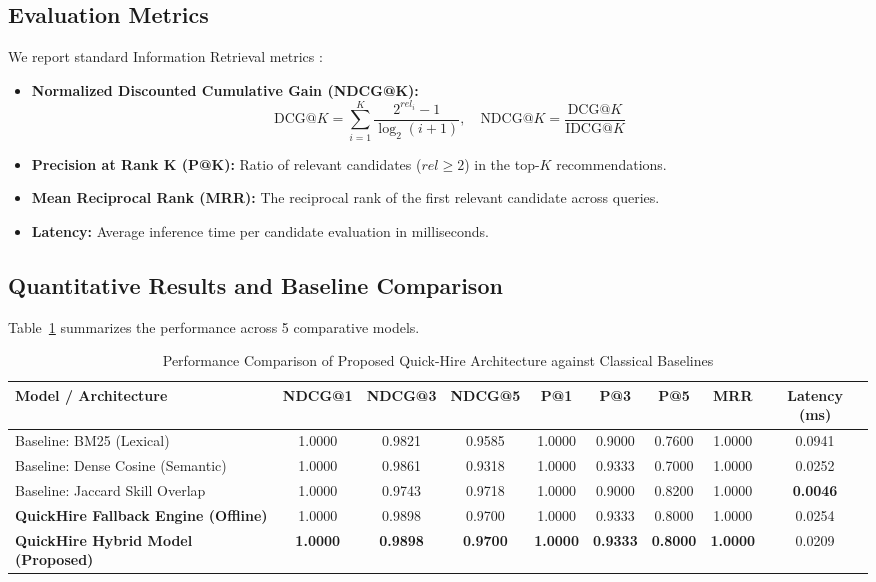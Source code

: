 \documentclass[conference]{IEEEtran}
\begin{document}
\subsection{Evaluation Metrics}
We report standard Information Retrieval metrics \cite{jarvelin2002cumulated}:
\begin{itemize}
    \item \textbf{Normalized Discounted Cumulative Gain (NDCG@K):}
    \begin{equation}
    \text{DCG}@K = \sum_{i=1}^K \frac{2^{rel_i} - 1}{\log_2(i + 1)}, \quad \text{NDCG}@K = \frac{\text{DCG}@K}{\text{IDCG}@K}
    \end{equation}
    \item \textbf{Precision at Rank K (P@K):} Ratio of relevant candidates ($rel \ge 2$) in the top-$K$ recommendations.
    \item \textbf{Mean Reciprocal Rank (MRR):} The reciprocal rank of the first relevant candidate across queries.
    \item \textbf{Latency:} Average inference time per candidate evaluation in milliseconds.
\end{itemize}

\subsection{Quantitative Results and Baseline Comparison}
Table~\ref{tab:results} summarizes the performance across 5 comparative models.

\begin{table}[t]
\caption{Performance Comparison of Proposed Quick-Hire Architecture against Classical Baselines}
\label{tab:results}
\centering
\begin{tabular}{@{}lcccccccc@{}}
\toprule
\textbf{Model / Architecture} & \textbf{NDCG@1} & \textbf{NDCG@3} & \textbf{NDCG@5} & \textbf{P@1} & \textbf{P@3} & \textbf{P@5} & \textbf{MRR} & \textbf{Latency (ms)} \\
\midrule
Baseline: BM25 (Lexical) & 1.0000 & 0.9821 & 0.9585 & 1.0000 & 0.9000 & 0.7600 & 1.0000 & 0.0941 \\
Baseline: Dense Cosine (Semantic) & 1.0000 & 0.9861 & 0.9318 & 1.0000 & 0.9333 & 0.7000 & 1.0000 & 0.0252 \\
Baseline: Jaccard Skill Overlap & 1.0000 & 0.9743 & 0.9718 & 1.0000 & 0.9000 & 0.8200 & 1.0000 & \textbf{0.0046} \\
\midrule
\textbf{QuickHire Fallback Engine (Offline)} & 1.0000 & 0.9898 & 0.9700 & 1.0000 & 0.9333 & 0.8000 & 1.0000 & 0.0254 \\
\textbf{QuickHire Hybrid Model (Proposed)} & \textbf{1.0000} & \textbf{0.9898} & \textbf{0.9700} & \textbf{1.0000} & \textbf{0.9333} & \textbf{0.8000} & \textbf{1.0000} & 0.0209 \\
\bottomrule
\end{tabular}
\end{table}
\end{document}
